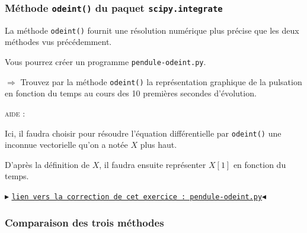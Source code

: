 \documentclass[11pt]{article}
\begin{document}
 





 
 
 
 
 
 

 
 
 
 \subsubsection{Méthode \texttt{odeint()} du paquet \texttt{scipy.integrate}}
 
 La méthode \texttt{odeint()} fournit une résolution numérique plus précise que les deux méthodes vus précédemment.
 
 \smallskip
 
 

Vous pourrez créer un programme \texttt{pendule-odeint.py}.

\smallskip


 
 $\Longrightarrow$ Trouvez par la méthode \texttt{odeint()} la représentation graphique de la pulsation en fonction du temps au cours des 10 premières secondes d'évolution.
 
 
 \smallskip
 
 \textsc{aide : }
 
 Ici, il faudra choisir pour résoudre l'équation différentielle par \texttt{odeint()} une inconnue vectorielle qu'on a notée $X$ plus haut. 
 
 D'après la définition de $X$, il faudra ensuite représenter $X[1]$ en fonction du temps.
 

 
 
 
 
 

\begin{center}
$\blacktriangleright$ \href{https://github.com/formationPythonPC-Juin/corrections-formation/blob/master/pendule-odeint.py}{\underline{\texttt{lien vers la correction de cet exercice : pendule-odeint.py}}}$\blacktriangleleft$                                                                                                                                                                    \end{center}


 
 
 
 

 
 
 \subsubsection{Comparaison des trois méthodes}
 
\end{document}
